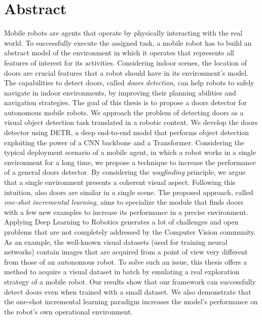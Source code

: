 \newpage
\chapter{Abstract}

Mobile robots are agents that operate by physically interacting with the real world. To successfully execute the assigned task, a mobile robot has to build an abstract model of the environment in which it operates that represents all features of interest for its activities. Considering indoor scenes, the location of doors are crucial features that a robot should have in its environment's model. The capabilities to detect doors, called \emph{doors detection}, can help robots to safely navigate in indoor environments, by improving their planning abilities and navigation strategies. The goal of this thesis is to propose a doors detector for autonomous mobile robots. We approach the problem of detecting doors as a visual object detection task translated in a robotic context. We develop the doors detector using DETR, a deep end-to-end model that performs object detection exploiting the power of a CNN backbone and a Transformer. Considering the typical deployment scenario of a mobile agent, in which a robot works in a single environment for a long time, we propose a technique to increase the performance of a general doors detector. By considering the \textit{wayfinding} principle, we argue that a single environment presents a coherent visual aspect. Following this intuition, also doors are similar in a single scene. The proposed approach, called \textit{one-shot incremental learning}, aims to specialize the module that finds doors with a few new examples to increase its performance in a precise environment. Applying Deep Learning to Robotics generates a lot of challenges and open problems that are not completely addressed by the Computer Vision community. As an example, the well-known visual datasets (used for training neural networks) contain images that are acquired from a point of view very different from those of an autonomous robot. To solve such an issue, this thesis offers a method to acquire a visual dataset in batch by emulating a real exploration strategy of a mobile robot. Our results show that our framework can successfully detect doors even when trained with a small dataset. We also demonstrate that the one-shot incremental learning paradigm increases the model's performance on the robot's own operational environment.

